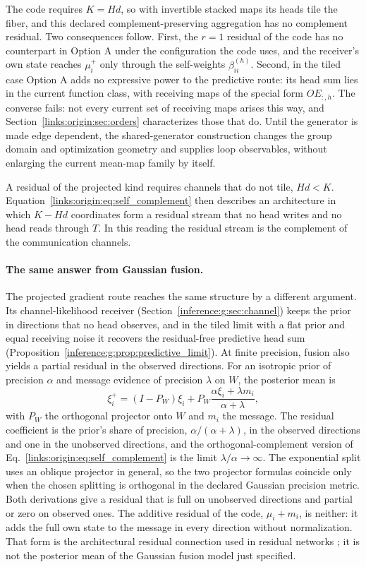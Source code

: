 \documentclass[11pt]{article}
\theoremstyle{definition}
\theoremstyle{remark}
\begin{document}
The code requires $K=Hd$, so with invertible stacked maps its heads tile the fiber, and this declared complement-preserving aggregation has no complement residual. Two consequences follow. First, the $r=1$ residual of the code has no counterpart in Option A under the configuration the code uses, and the receiver's own state reaches $\mu_i^+$ only through the self-weights $\beta_{ii}^{(h)}$. Second, in the tiled case Option A adds no expressive power to the predictive route: its head sum lies in the current function class, with receiving maps of the special form $OE_{:,h}$. The converse fails: not every current set of receiving maps arises this way, and Section~\ref{links:origin:sec:orders} characterizes those that do. Until the generator is made edge dependent, the shared-generator construction changes the group domain and optimization geometry and supplies loop observables, without enlarging the current mean-map family by itself.

A residual of the projected kind requires channels that do not tile, $Hd<K$. Equation~\eqref{links:origin:eq:self_complement} then describes an architecture in which $K-Hd$ coordinates form a residual stream that no head writes and no head reads through $T$. In this reading the residual stream is the complement of the communication channels.

\paragraph{The same answer from Gaussian fusion.}
The projected gradient route reaches the same structure by a different argument. Its channel-likelihood receiver (Section~\ref{inference:g:sec:channel}) keeps the prior in directions that no head observes, and in the tiled limit with a flat prior and equal receiving noise it recovers the residual-free predictive head sum (Proposition~\ref{inference:g:prop:predictive_limit}). At finite precision, fusion also yields a partial residual in the observed directions. For an isotropic prior of precision $\alpha$ and message evidence of precision $\lambda$ on $W$, the posterior mean is
\begin{equation}
\xi_i^+=(I-P_W)\xi_i+P_W\frac{\alpha\xi_i+\lambda m_i}{\alpha+\lambda},
\label{links:origin:eq:fusion_residual}
\end{equation}
with $P_W$ the orthogonal projector onto $W$ and $m_i$ the message. The residual coefficient is the prior's share of precision, $\alpha/(\alpha+\lambda)$, in the observed directions and one in the unobserved directions, and the orthogonal-complement version of Eq.~\eqref{links:origin:eq:self_complement} is the limit $\lambda/\alpha\to\infty$. The exponential split uses an oblique projector in general, so the two projector formulas coincide only when the chosen splitting is orthogonal in the declared Gaussian precision metric. Both derivations give a residual that is full on unobserved directions and partial or zero on observed ones. The additive residual of the code, $\mu_i+m_i$, is neither: it adds the full own state to the message in every direction without normalization. That form is the architectural residual connection used in residual networks \cite{links:he2016resnet}; it is not the posterior mean of the Gaussian fusion model just specified.
\end{document}

